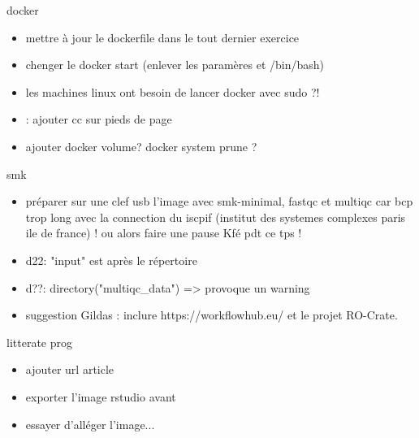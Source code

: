 \begin{frame}{docker}
\begin{itemize}
    \item mettre à jour le dockerfile dans le tout dernier exercice
    \item chenger le docker start (enlever les paramères et /bin/bash)
    \item les machines linux ont besoin de lancer docker avec sudo ?!
    \item : ajouter cc sur pieds de page
    \item ajouter docker volume? docker system prune ?
\end{itemize}
\end{frame}

\begin{frame}{smk}
\begin{itemize}
    \item préparer sur une clef usb l'image avec smk-minimal, fastqc et multiqc car bcp trop long avec la connection du iscpif  (institut des systemes complexes paris ile de france) ! ou alors faire une pause Kfé pdt ce tps !
    \item d22: "input" est après le répertoire
    \item d??: directory("multiqc\_data") => provoque un warning 
    \item suggestion Gildas : inclure https://workflowhub.eu/ et le projet RO-Crate.
\end{itemize}
\end{frame}

\begin{frame}{litterate prog}
\begin{itemize}
    \item ajouter url article
    \item exporter l'image rstudio avant
    \item essayer d'alléger l'image...
\end{itemize}
\end{frame}

